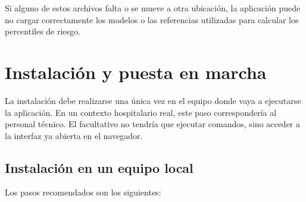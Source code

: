 \documentclass[
  spanish,
  a4paper,
  12pt,
  twoside]{memoir}
\begin{document}
Si alguno de estos archivos falta o se mueve a otra ubicación, la aplicación puede no cargar correctamente los modelos o las referencias utilizadas para calcular los percentiles de riesgo.

\section{Instalación y puesta en marcha}

La instalación debe realizarse una única vez en el equipo donde vaya a ejecutarse la aplicación. En un contexto hospitalario real, este paso correspondería al personal técnico. El facultativo no tendría que ejecutar comandos, sino acceder a la interfaz ya abierta en el navegador.

\subsection*{Instalación en un equipo local}

Los pasos recomendados son los siguientes:
\end{document}
